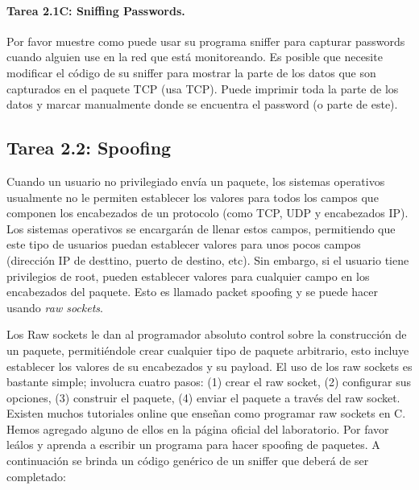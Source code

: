 \paragraph{Tarea 2.1C: Sniffing Passwords.}
Por favor muestre como puede usar su programa sniffer para capturar passwords cuando alguien use \telnet en la red que está monitoreando. Es posible que necesite modificar el código de su sniffer para mostrar la parte de los datos que son capturados en el paquete TCP (\telnet usa TCP). Puede imprimir toda la parte de los datos y marcar manualmente donde se encuentra el password (o parte de este).

\subsection{Tarea 2.2: Spoofing}

Cuando un usuario no privilegiado envía un paquete, los sistemas operativos usualmente no le permiten establecer los valores para todos los campos que componen los encabezados de un protocolo (como TCP, UDP y encabezados IP). Los sistemas operativos se encargarán de llenar estos campos, permitiendo que este tipo de usuarios puedan establecer valores para unos pocos campos (dirección IP de desttino, puerto de destino, etc). Sin embargo, si el usuario tiene privilegios de root, pueden establecer valores para cualquier campo en los encabezados del paquete. Esto es llamado packet spoofing y se puede hacer usando {\em raw sockets}. 


Los Raw sockets le dan al programador absoluto control sobre la construcción de un paquete, permitiéndole crear cualquier tipo de paquete arbitrario, esto incluye establecer los valores de su encabezados y su payload. El uso de los raw sockets es bastante simple; involucra cuatro pasos: (1) crear el raw socket, (2) configurar sus opciones, (3) construir el paquete, (4) enviar el paquete a través del raw socket. Existen muchos tutoriales online que enseñan como programar raw sockets en C. Hemos agregado alguno de ellos en la página oficial del laboratorio. Por favor leálos y aprenda a escribir un programa para hacer spoofing de paquetes. A continuación se brinda un código genérico de un sniffer que deberá de ser completado:

